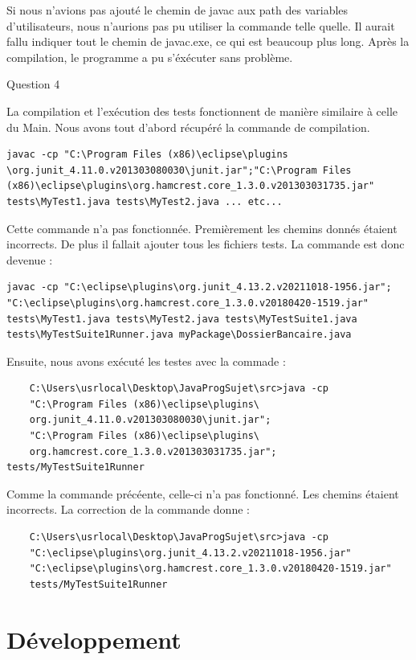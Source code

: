 \documentclass{article}
\begin{document}
Si nous n'avions pas ajouté le chemin de javac aux path des variables d'utilisateurs, nous n'aurions pas pu utiliser la commande telle quelle. Il aurait fallu indiquer tout le chemin de javac.exe, ce qui est beaucoup plus long.
Après la compilation, le programme a pu s'éxécuter sans problème.

\newline
Question 4
\newline

La compilation et l'exécution des tests fonctionnent de manière similaire à celle du Main.
Nous avons tout d'abord récupéré la commande de compilation.

	
\begin{lstlisting}
javac -cp "C:\Program Files (x86)\eclipse\plugins
\org.junit_4.11.0.v201303080030\junit.jar";"C:\Program Files 
(x86)\eclipse\plugins\org.hamcrest.core_1.3.0.v201303031735.jar" 
tests\MyTest1.java tests\MyTest2.java ... etc...
\end{lstlisting}
Cette commande n'a pas fonctionnée.
Premièrement les chemins donnés étaient incorrects. De plus il fallait ajouter tous les fichiers tests.
La commande est donc devenue :
\begin{lstlisting}
javac -cp "C:\eclipse\plugins\org.junit_4.13.2.v20211018-1956.jar";
"C:\eclipse\plugins\org.hamcrest.core_1.3.0.v20180420-1519.jar" 
tests\MyTest1.java tests\MyTest2.java tests\MyTestSuite1.java 
tests\MyTestSuite1Runner.java myPackage\DossierBancaire.java
\end{lstlisting}

Ensuite, nous avons exécuté les testes avec la commade :
\begin{lstlisting}
    C:\Users\usrlocal\Desktop\JavaProgSujet\src>java -cp 
    "C:\Program Files (x86)\eclipse\plugins\
    org.junit_4.11.0.v201303080030\junit.jar";
    "C:\Program Files (x86)\eclipse\plugins\
    org.hamcrest.core_1.3.0.v201303031735.jar"; tests/MyTestSuite1Runner
\end{lstlisting}

Comme la commande précéente, celle-ci n'a pas fonctionné. Les chemins étaient incorrects. La correction de la commande donne :

\begin{lstlisting}
    C:\Users\usrlocal\Desktop\JavaProgSujet\src>java -cp 
    "C:\eclipse\plugins\org.junit_4.13.2.v20211018-1956.jar"
    "C:\eclipse\plugins\org.hamcrest.core_1.3.0.v20180420-1519.jar"
    tests/MyTestSuite1Runner
\end{lstlisting}
\newpage
\section{Développement}
\end{document}
